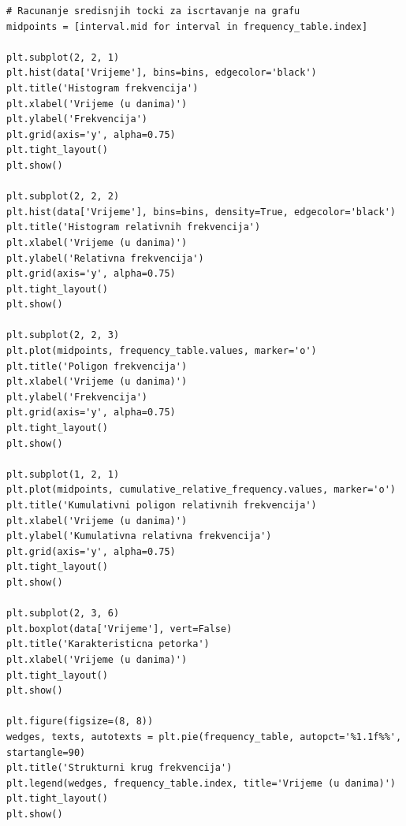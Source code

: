 \begin{lstlisting}[caption={Način konstruiranja grafičkih prikaza koristeći biblioteku \texttt{matplotlib}}, label=graphics]
# Racunanje sredisnjih tocki za iscrtavanje na grafu
midpoints = [interval.mid for interval in frequency_table.index]

plt.subplot(2, 2, 1)
plt.hist(data['Vrijeme'], bins=bins, edgecolor='black')
plt.title('Histogram frekvencija')
plt.xlabel('Vrijeme (u danima)')
plt.ylabel('Frekvencija')
plt.grid(axis='y', alpha=0.75)
plt.tight_layout()
plt.show()

plt.subplot(2, 2, 2)
plt.hist(data['Vrijeme'], bins=bins, density=True, edgecolor='black')
plt.title('Histogram relativnih frekvencija')
plt.xlabel('Vrijeme (u danima)')
plt.ylabel('Relativna frekvencija')
plt.grid(axis='y', alpha=0.75)
plt.tight_layout()
plt.show()

plt.subplot(2, 2, 3)
plt.plot(midpoints, frequency_table.values, marker='o')
plt.title('Poligon frekvencija')
plt.xlabel('Vrijeme (u danima)')
plt.ylabel('Frekvencija')
plt.grid(axis='y', alpha=0.75)
plt.tight_layout()
plt.show()

plt.subplot(1, 2, 1)
plt.plot(midpoints, cumulative_relative_frequency.values, marker='o')
plt.title('Kumulativni poligon relativnih frekvencija')
plt.xlabel('Vrijeme (u danima)')
plt.ylabel('Kumulativna relativna frekvencija')
plt.grid(axis='y', alpha=0.75)
plt.tight_layout()
plt.show()

plt.subplot(2, 3, 6)
plt.boxplot(data['Vrijeme'], vert=False)
plt.title('Karakteristicna petorka')
plt.xlabel('Vrijeme (u danima)')
plt.tight_layout()
plt.show()

plt.figure(figsize=(8, 8))
wedges, texts, autotexts = plt.pie(frequency_table, autopct='%1.1f%%', startangle=90)
plt.title('Strukturni krug frekvencija')
plt.legend(wedges, frequency_table.index, title='Vrijeme (u danima)')
plt.tight_layout()
plt.show()
\end{lstlisting}
